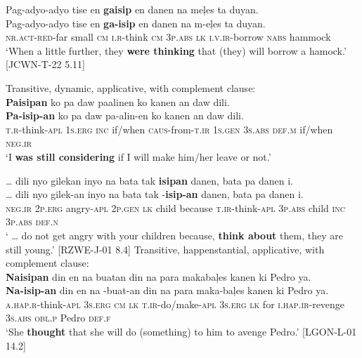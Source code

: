 \ea
Pag-adyo-adyo  tise  en  \textbf{gaisip}  en  danen  na  meļes ta  duyan. \\\smallskip
\gll Pag-adyo-adyo  tise  en  \textbf{ga-isip}  en  danen  na  m-eļes ta  duyan. \\
\textsc{nr.act}-\textsc{red}-far  small  \textsc{cm}  \textsc{i.r}-think  \textsc{cm}  3\textsc{p.abs}  \textsc{lk} \textsc{i.v.ir}-borrow \textsc{nabs}  hammock \\
\glt `When a little further, they \textbf{were thinking} that (they) will borrow a hamock.’ [JCWN-T-22 5.11]
\z

\ea
Transitive, dynamic, applicative, with complement clause: \\
\textbf{Paisipan}  ko  pa  daw  paalinen  ko  kanen  an daw  dili. \\\smallskip
\gll \textbf{Pa-isip-an}  ko  pa  daw  pa-alin-en  ko  kanen  an daw  dili. \\
\textsc{t.r}-think-\textsc{apl}  1\textsc{s.erg}  \textsc{inc}  if/when  \textsc{caus}-from-\textsc{t.ir}  1\textsc{s.gen}  3\textsc{s.abs}  \textsc{def.m} if/when  \textsc{neg.ir} \\
\glt `I \textbf{was still considering} if I will make him/her leave or not.’
\z

\ea
 … dili  nyo  gilekan  inyo  na  bata  tak  \textbf{isipan}  danen,   bata  pa  danen  i. \\\smallskip
\gll  … dili  nyo  gilek-an  inyo  na  bata  tak  \emptyset{}-\textbf{isip-an}  danen,   bata  pa  danen  i. \\
{} \textsc{neg.ir}  2\textsc{p.erg}  angry-\textsc{apl}  2\textsc{p.gen}  \textsc{lk}  child  because  \textsc{t.ir}-think-\textsc{apl}  3\textsc{p.abs}
child  \textsc{inc}  3\textsc{p.abs}  \textsc{def.n} \\
\glt ‘ … do not get angry with your children because, \textbf{think about} them, they are still young.’ [RZWE-J-01 8.4]
\z
\ea
Transitive, happenstantial, applicative, with complement clause: \\
\textbf{Naisipan}  din  en  na  buatan  din  na  para makabaļes  kanen  ki  Pedro  ya. \\\smallskip
\gll \textbf{Na-isip-an}  din  en  na  \emptyset{}-buat-an  din  na  para maka-baļes  kanen  ki  Pedro  ya. \\
\textsc{a.hap.r}-think-\textsc{apl}  3\textsc{s.erg}  \textsc{cm}  \textsc{lk}  \textsc{t.ir}-do/make-\textsc{apl}  3\textsc{s.erg}  \textsc{lk}  for
\textsc{i.hap.ir}-revenge  3\textsc{s.abs}  \textsc{obl.p}  Pedro  \textsc{def.f} \\
\glt ‘She \textbf{thought} that she will do (something) to him to avenge Pedro.' [LGON-L-01 14.2]
\z

